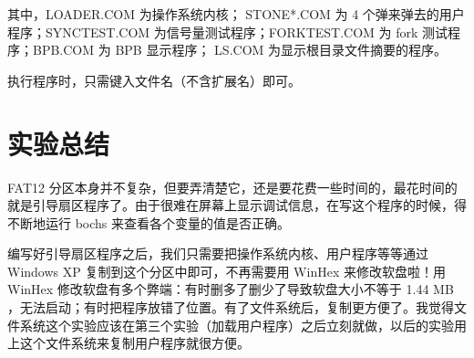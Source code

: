 \documentclass[a4paper]{article}
\begin{document}
其中，LOADER.COM 为操作系统内核； STONE*.COM 为 4 个弹来弹去的用户程序；SYNCTEST.COM 为信号量测试程序；FORKTEST.COM 为 fork 测试程序；BPB.COM 为 BPB 显示程序； LS.COM 为显示根目录文件摘要的程序。

执行程序时，只需键入文件名（不含扩展名）即可。

\section{实验总结}

FAT12 分区本身并不复杂，但要弄清楚它，还是要花费一些时间的，最花时间的就是引导扇区程序了。由于很难在屏幕上显示调试信息，在写这个程序的时候，得不断地运行 bochs 来查看各个变量的值是否正确。

编写好引导扇区程序之后，我们只需要把操作系统内核、用户程序等等通过 Windows XP 复制到这个分区中即可，不再需要用 WinHex 来修改软盘啦！用 WinHex 修改软盘有多个弊端：有时删多了删少了导致软盘大小不等于 1.44 MB ，无法启动；有时把程序放错了位置。有了文件系统后，复制更方便了。我觉得文件系统这个实验应该在第三个实验（加载用户程序）之后立刻就做，以后的实验用上这个文件系统来复制用户程序就很方便。
\end{document}
